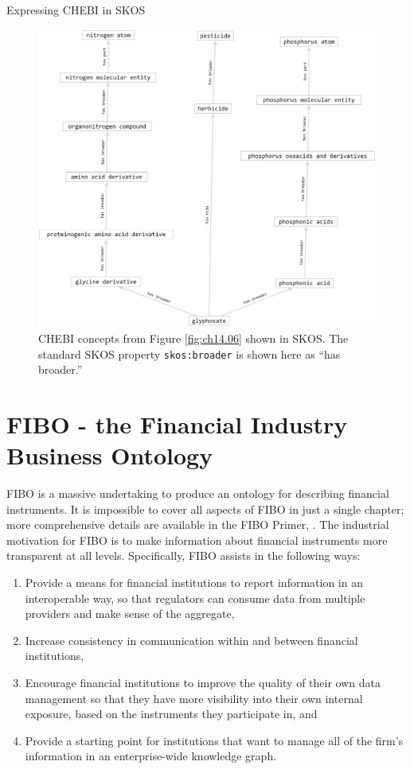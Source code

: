 \begin{challenge}{Expressing CHEBI in SKOS}
\begin{figure}
\centering
\includegraphics[width=5in]{SWWOv3/media/ch14/figure14-3.png}
\caption{CHEBI concepts from Figure \protect\ref{fig:ch14.06} shown in SKOS. The standard SKOS
property \texttt{skos:broader} is shown here as ``has broader.''
}
\label{fig:ch14.07}
\end{figure}
\end{challenge}

\section{FIBO - the Financial Industry Business Ontology}
\label{section:fibo}

FIBO is a massive undertaking to produce an ontology for describing financial instruments.  It is impossible to cover all aspects of FIBO 
in just a single chapter; more comprehensive details are available in the FIBO Primer,
\cite{fiboprimer}.   The industrial
motivation for FIBO is to make information about financial instruments more transparent at all levels. 
Specifically, 
FIBO assists in the following ways:

\begin{enumerate}
    \item Provide a means for financial institutions to report information in an interoperable way, so that regulators can 
    consume data from multiple providers and make sense of the aggregate, 
    \item Increase consistency in communication within and between financial institutions, 
    \item Encourage financial institutions to improve the quality of their own data management so that they have 
    more visibility into their own internal exposure, based on the instruments they participate in, and 
    \item Provide a starting point for institutions that want to manage all of the firm's information in an enterprise-wide knowledge graph. 
\end{enumerate}

